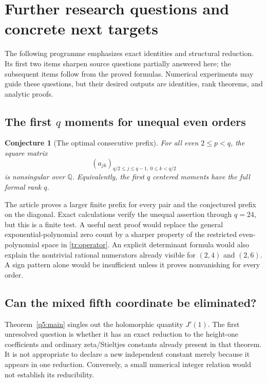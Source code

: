 \documentclass[11pt,a4paper]{article}
\numberwithin{equation}{section}
\newtheorem{conjecture}[theorem]{Conjecture}
\theoremstyle{definition}
\newcommand{\Q}{\mathbb Q}
\begin{document}

\section{Further research questions and concrete next targets}
\label{sec:questions}

The following programme emphasizes exact identities and structural
reduction. Its first two items sharpen source questions partially
answered here; the subsequent items follow from the proved formulas.
Numerical experiments may guide these questions, but their desired
outputs are identities, rank theorems, and analytic proofs.

\subsection{The first \texorpdfstring{$q$}{q} moments for unequal even orders}

\begin{conjecture}[The optimal consecutive prefix]\label{conj:firstq}
For all even $2\le p<q$, the square matrix
\[
 (a_{jk})_{q/2\le j\le q-1,\ 0\le k<q/2}
\]
is nonsingular over $\Q$. Equivalently, the first $q$ centered
moments have the full formal rank $q$.
\end{conjecture}

The article proves a larger finite prefix for every pair and the
conjectured prefix on the diagonal. Exact calculations verify the
unequal assertion through $q=24$, but this is a finite test.
A useful next proof would replace the general exponential-polynomial
zero count by a sharper property of the restricted even-polynomial
space in \eqref{tr:operator}. An explicit determinant formula would
also explain the nontrivial rational numerators already visible for
$(2,4)$ and $(2,6)$. A sign pattern alone would be insufficient unless
it proves nonvanishing for every order.

\subsection{Can the mixed fifth coordinate be eliminated?}

Theorem~\ref{q5:main} singles out the holomorphic quantity $J'(1)$.
The first unresolved question is whether it has an exact reduction
to the height-one coefficients and ordinary zeta/Stieltjes constants
already present in that theorem. It is not appropriate to declare a
new independent constant merely because it appears in one reduction.
Conversely, a small numerical integer relation would not establish
its reducibility.
\end{document}
